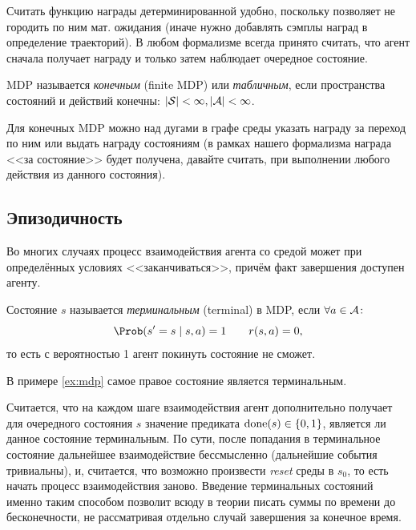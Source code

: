 Считать функцию награды детерминированной удобно, поскольку позволяет не городить по ним мат. ожидания (иначе нужно добавлять сэмплы наград в определение траекторий). В любом формализме всегда принято считать, что агент сначала получает награду и только затем наблюдает очередное состояние. 

\begin{definition}
MDP называется \emph{конечным} (finite MDP) или \emph{табличным}, если пространства состояний и действий конечны: $|\mathcal{S}| < \infty, |\mathcal{A}| < \infty$.
\end{definition}

\begin{exampleBox}[label=ex:mdp]{}
Для конечных MDP можно над дугами в графе среды указать награду за переход по ним или выдать награду состояниям (в рамках нашего формализма награда <<за состояние>> будет получена, давайте считать, при выполнении любого действия из данного состояния).
\begin{center}
\end{center}
\end{exampleBox}

\subsection{Эпизодичность}

Во многих случаях процесс взаимодействия агента со средой может при определённых условиях <<заканчиваться>>, причём факт завершения доступен агенту.

\begin{definition}
Состояние $s$ называется \emph{терминальным} (terminal) в MDP, если $\forall a \in \mathcal{A} \colon$
$$\Prob (s' = s \mid s, a) = 1 \qquad r(s, a) = 0,$$
то есть с вероятностью 1 агент покинуть состояние не сможет.
\end{definition}

\begin{example}
В примере \ref{ex:mdp} самое правое состояние является терминальным.
\end{example}

Считается, что на каждом шаге взаимодействия агент дополнительно получает для очередного состояния $s$ значение предиката $\done(s) \HM\in \{0, 1\}$, является ли данное состояние терминальным. По сути, после попадания в терминальное состояние дальнейшее взаимодействие бессмысленно (дальнейшие события тривиальны), и, считается, что возможно произвести \emph{reset} среды в $s_0$, то есть начать процесс взаимодействия заново. Введение терминальных состояний именно таким способом позволит всюду в теории писать суммы по времени до бесконечности, не рассматривая отдельно случай завершения за конечное время.

